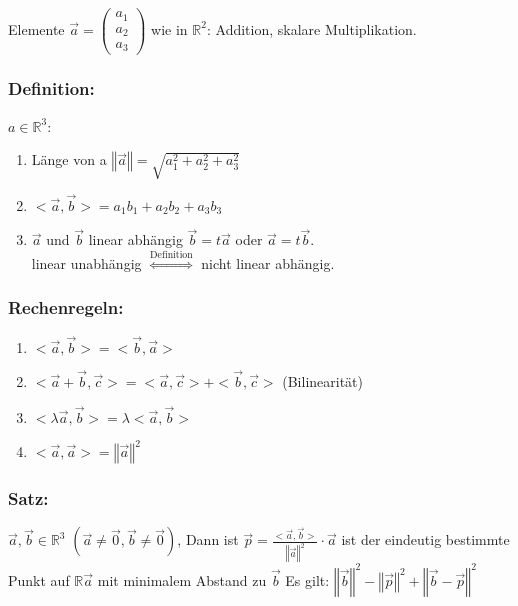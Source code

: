 %
%
%
Elemente $\vec{a} = \begin{pmatrix}a_{1} \\ a_{2} \\ a_{3} \end{pmatrix}$
 wie in $\mathbb{R}^{2}$: Addition, skalare Multiplikation. \\
%
%
%
\subsubsection{Definition:}
$a \in \mathbb{R}^{3}$:
\begin{enumerate}
 \item Länge von a \quad $\left\Vert\vec{a}\right\Vert = \sqrt{a_{1}^{2} + a_{2}^{2} + a_{3}^{2}}$ 
 \item ${<}\vec{a}, \vec{b}{>} = a_{1}b_{1} + a_{2}b_{2} + a_{3}b_{3}$
 \item $ \vec{a}$ und $\vec{b}$ linear abhängig $\vec{b} = t\vec{a}$ oder $\vec{a} = t\vec{b}$.\\
 linear unabhängig $\mathop{\Leftrightarrow}\limits^{\text{Definition}}$ nicht linear abhängig.
\end{enumerate}
%
%
%
\subsubsection{Rechenregeln:}
\begin{enumerate}
 \item ${<}\vec{a}, \vec{b}{>} = {<}\vec{b}, \vec{a}{>}$
 \item ${<}\vec{a} + \vec{b}, \vec{c}{>} = <\vec{a}, \vec{c}> + <\vec{b}, \vec{c}>$ (Bilinearität)
 \item $<\lambda\vec{a}, \vec{b}> = \lambda <\vec{a}, \vec{b}>$
 \item $<\vec{a}, \vec{a}> = \left\Vert\vec{a}\right\Vert^{2}$
\end{enumerate}
%
%
%
\subsubsection{Satz:}
$\vec{a},\vec{b} \in \mathbb{R}^3$ $(\vec{a} \neq \vec{0}, \vec{b} \neq \vec{0})$, 
Dann ist $\vec{p}=\frac{<\vec{a},\vec{b}>}{\left\Vert\vec{a}\right\Vert^{2}} \cdot\vec{a}$
ist der eindeutig bestimmte Punkt auf $\mathbb{R}\vec{a}$ mit minimalem Abstand zu $\vec{b}$ Es gilt:
$ \left\Vert\vec{b}\right\Vert^{2} - \left\Vert\vec{p}\right\Vert^{2} + \left\Vert\vec{b} - \vec{p}\right\Vert^{2}$
%
%
